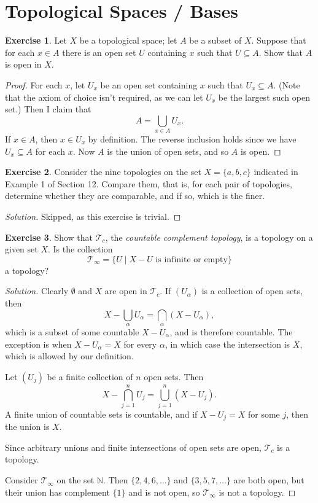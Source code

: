\documentclass{article}
\theoremstyle{definition}
\newtheorem{exercise}{Exercise}[section]
\begin{document}
\addtocounter{section}{12}
\section{Topological Spaces / Bases}

\begin{exercise}
  Let $X$ be a topological space; let $A$ be a subset of $X$. Suppose that for each $x\in A$ there is an open set $U$ containing $x$ such that $U\subseteq A$. Show that $A$ is open in $X$.
\end{exercise}
\begin{proof}
  For each $x$, let $U_x$ be an open set containing $x$ such that $U_x\subseteq A$.
  (Note that the axiom of choice isn't required, as we can let $U_x$ be the largest such open set.) Then I claim that
  $$A = \bigcup_{x\in A} U_x.$$
  If $x\in A$, then $x\in U_x$ by definition. The reverse inclusion holds since we have $U_x\subseteq A$ for each $x$. Now $A$ is the union of open sets, and so $A$ is open.
\end{proof}

\begin{exercise}
  Consider the nine topologies on the set $X = \{a, b, c\}$ indicated in Example 1
 of Section 12. Compare them, that is, for each pair of topologies, determine whether
 they are comparable, and if so, which is the finer.
\end{exercise}
\begin{proof}[Solution]
  Skipped, as this exercise is trivial.
\end{proof}

\begin{exercise}
  Show that $\mathcal{T}_c$, the \textit{countable complement topology}, is a topology on a given set $X$.
  Is the collection
  $$\mathcal{T}_{\infty} = \{U\mid \text{$X-U$ is infinite or empty}\}$$
  a topology?
\end{exercise}
\begin{proof}[Solution]
  Clearly $\emptyset$ and $X$ are open in $\mathcal{T}_c$. If $(U_\alpha)$ is a collection of open sets, then
  $$X - \bigcup_{\alpha}U_\alpha = \bigcap_{\alpha}(X - U_\alpha),$$
  which is a subset of some countable $X - U_\alpha$, and is therefore countable. The exception is when $X - U_\alpha = X$ for every $\alpha$, in which case the intersection is $X$, which is allowed by our definition.

  Let $(U_j)$ be a finite collection of $n$ open sets. Then
  $$X - \bigcap_{j=1}^n U_j = \bigcup_{j=1}^n (X - U_j).$$
  A finite union of countable sets is countable, and if $X - U_j = X$ for some $j$, then the union is $X$.

  Since arbitrary unions and finite intersections of open sets are open, $\mathcal{T}_c$ is a topology.

  Consider $\mathcal{T}_\infty$ on the set $\mathbb{N}$. Then $\{2,4,6,\dots\}$ and $\{3,5,7,\dots\}$ are both open, but their union has complement $\{1\}$ and is not open, so $\mathcal{T}_\infty$ is not a topology.
\end{proof}
\end{document}
